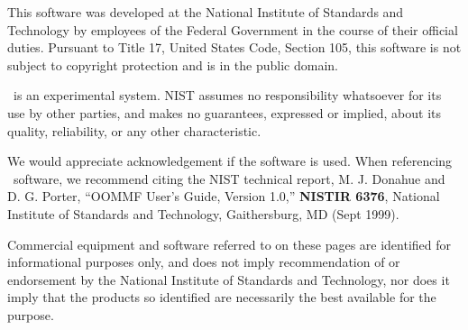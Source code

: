 This software was developed at the National Institute of Standards and
Technology by employees of the Federal Government in the course of their
official duties.  Pursuant to Title 17, United States Code, Section 105,
this software is not subject to copyright protection and is in the
public domain.

\OOMMF\ is an experimental system.  NIST assumes no responsibility
whatsoever for its use by other parties, and makes no guarantees,
expressed or implied, about its quality, reliability, or any other
characteristic.

We would appreciate acknowledgement if the software is used.  When
referencing \OOMMF\ software, we recommend citing the NIST technical
report, M. J. Donahue and D. G. Porter, ``OOMMF User's Guide, Version
1.0,'' \textbf{NISTIR 6376}, National Institute of Standards and
Technology, Gaithersburg, MD (Sept 1999).

Commercial equipment and software referred to on these pages are
identified for informational purposes only, and does not imply
recommendation of or endorsement by the National Institute of Standards
and Technology, nor does it imply that the products so identified are
necessarily the best available for the purpose.
